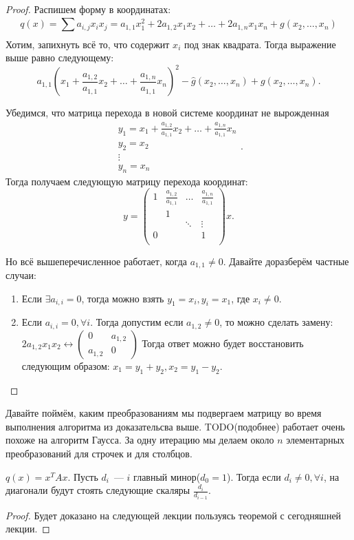 \begin{proof}
    Распишем форму в координатах:
    \[
        q(x) = \sum\limits_{}^{}{a_{i,j} x_i x_j} = a_{1,1}x_1^2 + 2a_{1,2}x_1x_2 + \dots + 2a_{1,n}x_1x_n +
        g(x_2,\dots, x_n)
    \]
    Хотим, запихнуть всё то, что содержит $x_i$ под знак квадрата.
    Тогда выражение выше равно следующему:
    \[
        a_{1,1}\left(x_1 + \frac{a_{1,2}}{a_{1,1}}x_2 + \dots + \frac{a_{1,n}}{a_{1,1}}x_n\right)^2 -
        \hat{g}(x_2,\dots, x_n) + g(x_2,\dots, x_n)
    .\]
    
    Убедимся, что матрица перехода в новой системе координат не вырожденная
     \[
         \begin{gathered}
             y_1 = x_1 + \frac{a_{1,2}}{a_{1,1}}x_2 + \dots + \frac{a_{1,n}}{a_{1,1}}x_n\\
             y_2 = x_2\\
             \vdots\\
             y_n = x_n
         \end{gathered}
    .\] 
    Тогда получаем следующую матрицу перехода координат:
    \[
    y = 
    \begin{pmatrix}
        1 & \frac{a_{1,2}}{a_{1,1}} & \dots & \frac{a_{1,n}}{a_{1,1}}\\
          & 1 & &\\
          &  & \ddots &\vdots\\
          0 & & & 1\\
    \end{pmatrix} x
    .\] 

    Но всё вышеперечисленное работает, когда $a_{1,1}\not= 0$.
    Давайте доразберём частные случаи:
    \begin{enumerate}
        \item
        Если $\exists a_{i,i} = 0$, тогда можно взять $y_1 = x_i, y_i = x_1$, где $x_i \neq 0$.
        \item
            Если $a_{i,i} = 0,\forall i$. Тогда допустим если $a_{1,2}\not=0$, то можно сделать замену:
        $2a_{1,2} x_1 x_2 \leftrightarrow
        \begin{pmatrix}
            0 & a_{1,2}\\
            a_{1, 2} & 0
        \end{pmatrix}$
        Тогда ответ можно будет восстановить следующим образом:
        $x_1 = y_1 + y_2, x_2 = y_1 - y_2$.
    \end{enumerate}
\end{proof}
Давайте поймём, каким преобразованиям мы подвергаем матрицу во время выполнения алгоритма из доказательсва
выше.
TODO(подобнее) работает очень похоже на алгоритм Гаусса. За одну итерацию мы делаем около $n$ элементарных
преобразований для строчек и для столбцов.
\begin{theorem}
    $q(x) = x^T Ax$. Пусть $d_i$~--- $i$ главный минор($d_0=1$). Тогда если $d_i \not= 0,\forall i$, на диагонали
    будут стоять следующие скаляры $\frac{d_i}{d_{i - 1}}$.
\end{theorem}
\begin{proof}
    Будет доказано на следующей лекции пользуясь теоремой с сегодняшней лекции.
\end{proof}
